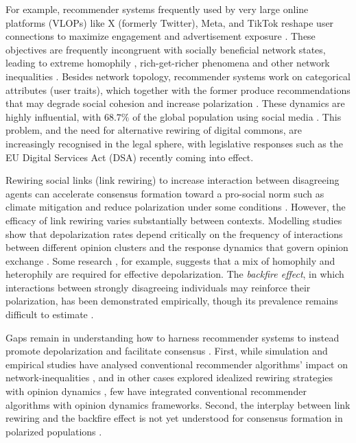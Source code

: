 \documentclass[unnumsec,webpdf,contemporary,large]{oup-authoring-template}%
\theoremstyle{thmstyleone}%
\theoremstyle{thmstyletwo}%
\theoremstyle{thmstylethree}%
\begin{document}
For example, recommender systems frequently used by very large online platforms (VLOPs) like X (formerly Twitter), Meta, and TikTok reshape user connections to maximize engagement and advertisement exposure \cite{pappalardo_survey_2024}.  These objectives are frequently incongruent with socially beneficial network states, leading to extreme homophily \cite{stoica_algorithmic_2018,starniniEmergenceMetapopulationsEcho2016}, rich-get-richer phenomena \cite{merton_matthew_1988, su_effect_2016} and other network inequalities \cite{cinus_effect_2022}. Besides network topology, recommender systems work on categorical attributes (user traits), which together with the former produce recommendations that may degrade social cohesion and increase polarization \cite{santos_link_2021, lasser_designing_2025}. These dynamics are highly influential, with $68.7\%$ of the global population using social media \citep{noauthor_internet_nodate}. This problem, and the need for alternative rewiring of digital commons, are increasingly recognised in the legal sphere, with legislative responses such as the EU Digital Services Act (DSA) recently coming into effect.

Rewiring social links (link rewiring) to increase interaction between disagreeing agents can accelerate consensus formation toward a pro-social norm such as climate mitigation and reduce polarization under some conditions \cite{pappalardo_survey_2024}. However, the efficacy of link rewiring varies substantially between contexts. Modelling studies show that depolarization rates depend critically on the frequency of interactions between different opinion clusters and the response dynamics that govern opinion exchange \citep{axelrod_preventing_2021,fotouhi_conjoining_2018,andersson_dynamics_2021}. Some research \cite{borges_how_2024}, for example, suggests that a mix of homophily and heterophily are required for effective depolarization. The \textit{backfire effect}, in which interactions between strongly disagreeing individuals may reinforce their polarization, has been demonstrated empirically\citep{santoroPromisePitfallsCrosspartisan2022, bail_exposure_2018}, though its prevalence remains difficult to estimate \cite{wood_elusive_2019}.

Gaps remain in understanding how to harness recommender systems to instead promote depolarization and facilitate consensus \citep{pappalardo_survey_2024}. First, while simulation and empirical studies have analysed conventional recommender algorithms' impact on network-inequalities \cite{ferrara_link_2022, espin-noboa_inequality_2022}, and in other cases explored idealized rewiring strategies with opinion dynamics \citep{santos_link_2021, borges_how_2024, sasahara_social_2021}, few have integrated conventional recommender algorithms with opinion dynamics frameworks. Second, the interplay between link rewiring and the backfire effect is not yet understood for consensus formation in polarized populations  \cite{pappalardo_survey_2024}.
\end{document}
